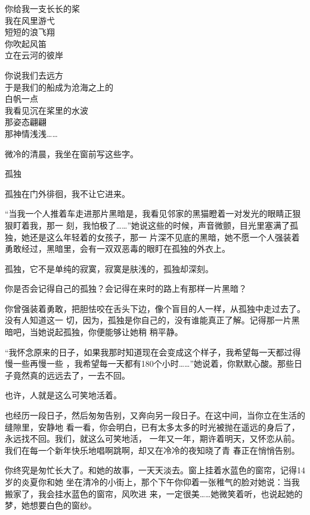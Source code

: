 \documentclass[12pt,a4paper]{article}
\newcommand{\subpart}[1]{
	\begingroup \par
	\vspace{1ex} \centering #1
	\par \endgroup
}
\begin{document}
		你给我一支长长的桨 \\
		我在风里游弋 \\
		短短的浪飞翔 \\
		你吹起风笛 \\
		立在云河的彼岸

		你说我们去远方 \\
		于是我们的船成为沧海之上的 \\
		白帆一点 \\
		我看见沉在桨里的水波 \\
		那姿态翩翩 \\
		那神情浅浅……
		\endlongpoem

	\endwriting



		微冷的清晨，我坐在窗前写这些字。

		\subpart{孤独}
		孤独在门外徘徊，我不让它进来。

		“当我一个人推着车走进那片黑暗是，我看见邻家的黑猫瞪着一对发光的眼睛正狠狠盯着我，那一
	刻，我怕极了……”她说这些的时候，声音微颤，目光里塞满了孤独，她还是这么年轻着的女孩子，那一
	片深不见底的黑暗，她不愿一个人强装着勇敢经过，黑暗里，会有一双双恶毒的眼盯在孤独的外衣上。

		孤独，它不是单纯的寂寞，寂寞是肤浅的，孤独却深刻。

		你是否会记得自己的孤独？会记得在来时的路上有那样一片黑暗？

		你曾强装着勇敢，把胆怯咬在舌头下边，像个盲目的人一样，从孤独中走过去了。没有人知道这一
	切，因为，孤独是你自己的，没有谁能真正了解。记得那一片黑暗吧，当她说起孤独，你便能够让她稍
	稍平静。

		“我怀念原来的日子，如果我那时知道现在会变成这个样子，我希望每一天都过得慢一些再慢一些
	，我希望每一天都有180个小时……”她说着，你默默心酸。那些日子竟然真的远远去了，一去不回。

		也许，人就是这么可笑地活着。

		也经历一段日子，然后匆匆告别，又奔向另一段日子。在这中间，当你立在生活的缝隙里，安静地
	看一看，你会明白，已有太多太多的时光被抛在遥远的身后了，永远找不回。我们，就这么可笑地活，
	一年又一年，期许着明天，又怀恋从前。我们在每一个新年快乐地唱啊跳啊，却又在冷冷的夜知晓了青
	春正在悄悄告别。

		你终究是匆忙长大了。和她的故事，一天天淡去。窗上挂着水蓝色的窗帘，记得14岁的炎夏你和她
	坐在清冷的小街上，那个下午你仰着一张稚气的脸对她说：当我搬家了，我会挂水蓝色的窗帘，风吹进
	来，一定很美……她微笑着听，也说起她的梦，她想要白色的窗纱。
\end{document}
